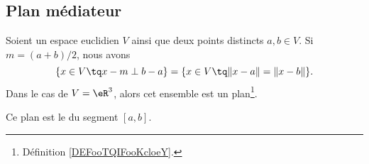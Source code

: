 \subsection{Plan médiateur}

\begin{proposition}        \label{PROPooSNUDooTxovMz}
	Soient un espace euclidien \( V\) ainsi que deux points distincts \( a,b\in V\). Si \( m=(a+b)/2\), nous avons
	\begin{equation}
		\{ x\in V\tq x-m\perp b-a \}=\{ x\in V\tq \| x-a \|=\| x-b \| \}.
	\end{equation}
	Dans le cas de \( V=\eR^3\), alors cet ensemble est un plan\footnote{Définition \ref{DEFooTQIFooKcloeY}.}.

	Ce plan est le  du segment \( [a,b]\).
\end{proposition}


